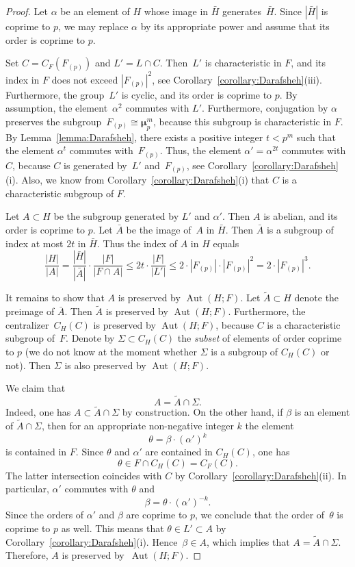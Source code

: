 \documentclass[12pt]{amsart}
\numberwithin{equation}{section}
\theoremstyle{definition}
\newcommand{\mumu}{\boldsymbol{\mu}}
\DeclareMathOperator{\Aut}{Aut}
\def \le {\leqslant}
\begin{document}
\begin{proof}
Let $\alpha$ be an element of $H$ whose image in $\bar{H}$ generates~$\bar{H}$.
Since $|\bar{H}|$ is coprime to $p$, we may replace $\alpha$ by its appropriate power and assume that its order is coprime to $p$.

Set $C=C_F(F_{(p)})$ and $L'=L\cap C$.
Then~$L'$ is characteristic in $F$, and its index in $F$ does not exceed
$|F_{(p)}|^2$, see Corollary~\ref{corollary:Darafsheh}(iii).
Furthermore, the group~$L'$ is cyclic, and its order is coprime to $p$.
By assumption, the element~$\alpha^2$ commutes with $L'$.
Furthermore, conjugation by $\alpha$ preserves
the subgroup~\mbox{$F_{(p)}\cong\mumu_p^m$}, because this subgroup is
characteristic in $F$. By Lemma~\ref{lemma:Darafsheh},
there exists a positive integer $t<p^m$ such that the element
$\alpha^t$ commutes with~$F_{(p)}$. Thus, the element $\alpha'=\alpha^{2t}$
commutes with $C$, because $C$ is generated by~$L'$ and~$F_{(p)}$, see Corollary~\ref{corollary:Darafsheh}(i).
Also, we know from Corollary~\ref{corollary:Darafsheh}(i) that
$C$ is a characteristic subgroup of $F$.

Let $A\subset H$ be the subgroup generated by $L'$ and $\alpha'$.
Then $A$ is abelian, and its order is coprime to $p$.
Let $\bar{A}$ be the image of~$A$ in
$\bar{H}$. Then
$\bar{A}$ is a subgroup of index at most $2t$
in $\bar{H}$.
Thus the index of $A$ in $H$ equals
$$
\frac{|H|}{|A|}=\frac{|\bar{H}|}{|\bar{A}|}\cdot \frac{|F|}{|F\cap A|}\le 2t\cdot \frac{|F|}{|L'|}\le 2\cdot |F_{(p)}|\cdot |F_{(p)}|^2=2\cdot |F_{(p)}|^3.
$$

It remains to show that $A$ is preserved by $\Aut(H;F)$.
Let $\tilde{A}\subset H$ denote the preimage of $\bar{A}$. Then
$\tilde{A}$ is preserved by $\Aut(H;F)$.
Furthermore, the centralizer~$C_H(C)$ is preserved by $\Aut(H;F)$,
because $C$ is a characteristic
subgroup of~$F$. Denote by $\Sigma\subset C_H(C)$ the \emph{subset}
of elements of order coprime to $p$ (we do not know at the moment whether $\Sigma$
is a subgroup of $C_H(C)$ or not).
Then $\Sigma$ is also preserved by $\Aut(H;F)$.

We claim that
$$
A=\tilde{A}\cap \Sigma.
$$
Indeed, one has $A\subset \tilde{A}\cap \Sigma$
by construction.
On the other hand, if $\beta$ is an element
of $\tilde{A}\cap \Sigma$, then for an appropriate non-negative integer $k$ the element
$$
\theta=\beta\cdot (\alpha')^k
$$
is contained in $F$. Since $\theta$ and $\alpha'$ are contained in $C_H(C)$, one has
$$
\theta \in F\cap C_H(C)=C_F(C).
$$
The latter intersection coincides with $C$ by Corollary~\ref{corollary:Darafsheh}(ii).
In particular, $\alpha'$ commutes with $\theta$ and
$$
\beta=\theta\cdot (\alpha')^{-k}.
$$
Since the orders of $\alpha'$ and  $\beta$
are coprime to $p$, we conclude that the order of~$\theta$
is coprime to $p$ as well. This means that
$\theta\in L'\subset A$ by Corollary~\ref{corollary:Darafsheh}(i).
Hence~\mbox{$\beta\in A$},
which implies that $A=\tilde{A}\cap \Sigma$. Therefore, $A$ is preserved by~$\Aut(H;F)$.
\end{proof}
\end{document}
